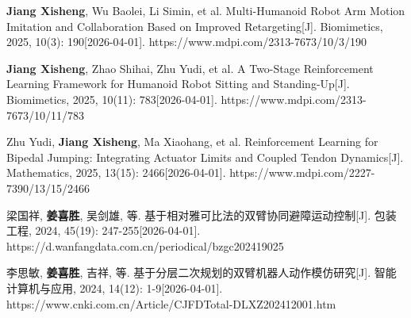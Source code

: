 \begin{resume}
	\setlength{\parskip}{0pt}
	\setlength{\parindent}{0pt}
  \begin{publications}
    
    
    \item[1.] \textbf{Jiang Xisheng}, Wu Baolei, Li Simin, et al. 
    Multi-Humanoid Robot Arm Motion Imitation and Collaboration Based on Improved Retargeting[J]. 
    Biomimetics, 2025, 10(3): 190[2026-04-01]. 
    https://www.mdpi.com/2313-7673/10/3/190
    
    \item[2.] \textbf{Jiang Xisheng}, Zhao Shihai, Zhu Yudi, et al. 
    A Two-Stage Reinforcement Learning Framework for Humanoid Robot Sitting and Standing-Up[J]. 
    Biomimetics, 2025, 10(11): 783[2026-04-01]. 
    https://www.mdpi.com/2313-7673/10/11/783
    
    \item[3.] Zhu Yudi, \textbf{Jiang Xisheng}, Ma Xiaohang, et al. 
    Reinforcement Learning for Bipedal Jumping: Integrating Actuator Limits and Coupled Tendon Dynamics[J]. 
    Mathematics, 2025, 13(15): 2466[2026-04-01]. 
    https://www.mdpi.com/2227-7390/13/15/2466
    
    \item[4.] 梁国祥, \textbf{姜喜胜}, 吴剑雄, 等. 
    基于相对雅可比法的双臂协同避障运动控制[J]. 
    包装工程, 2024, 45(19): 247-255[2026-04-01]. 
    https://d.wanfangdata.com.cn/periodical/bzgc202419025
    
    \item[5.] 李思敏, \textbf{姜喜胜}, 吉祥, 等. 
    基于分层二次规划的双臂机器人动作模仿研究[J]. 
    智能计算机与应用, 2024, 14(12): 1-9[2026-04-01]. 
    https://www.cnki.com.cn/Article/CJFDTotal-DLXZ202412001.htm
    
    \end{publications}
%    
%    
\end{resume}


